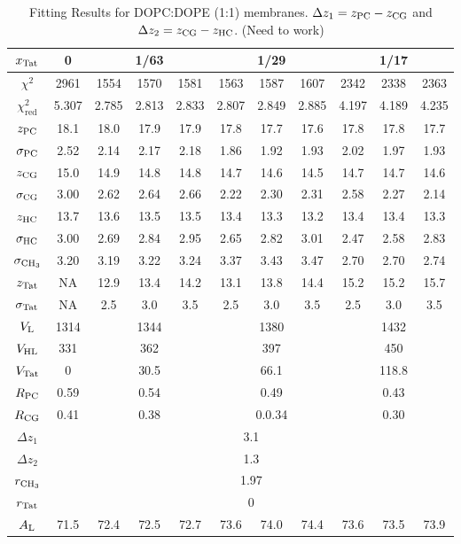 \begin{table}[htbp]
  \centering
  \begin{tabular}{|c|c|c|c|c|c|c|c|c|c|c|}
    \hline
    $x_\textrm{Tat}$ & 0 & \multicolumn{3}{c|}{1/63} & \multicolumn{3}{c|}{1/29} & \multicolumn{3}{c|}{1/17} \\
    \hline
    $\chi^2$ & 2961 & 1554 & 1570 & 1581 & 1563 & 1587 & 1607 & 2342 & 2338 & 2363 \\ 
    $\chi^2_\textrm{red}$ & 5.307 & 2.785 & 2.813 & 2.833 & 2.807 & 2.849 & 2.885 & 4.197 & 4.189 & 4.235 \\
    \hline
    $z_\textrm{PC}$ & 18.1 & 18.0 & 17.9 & 17.9 & 17.8 & 17.7 & 17.6 & 17.8 & 17.8 & 17.7 \\
    $\sigma_\textrm{PC}$ & 2.52 & 2.14 & 2.17 & 2.18 & 1.86 & 1.92 & 1.93 & 2.02 & 1.97 & 1.93 \\
    $z_\textrm{CG}$ & 15.0 & 14.9 & 14.8 & 14.8 & 14.7 & 14.6 & 14.5 & 14.7 & 14.7 & 14.6 \\
    $\sigma_\textrm{CG}$ & 3.00 & 2.62 & 2.64 & 2.66 & 2.22 & 2.30 & 2.31 & 2.58 & 2.27 & 2.14 \\
    $z_\textrm{HC}$ & 13.7 & 13.6 & 13.5 & 13.5 & 13.4 & 13.3 & 13.2 & 13.4 & 13.4 & 13.3 \\ 
    $\sigma_\textrm{HC}$ & 3.00 & 2.69 & 2.84 & 2.95 & 2.65 & 2.82 & 3.01 & 2.47 & 2.58 & 2.83 \\
    $\sigma_{\textrm{CH}_3}$ & 3.20 & 3.19 & 3.22 & 3.24 & 3.37 & 3.43 & 3.47 & 2.70 & 2.70 & 2.74 \\
    $z_\textrm{Tat}$ & NA & 12.9 & 13.4 & 14.2 & 13.1 & 13.8 & 14.4 & 15.2 & 15.2 & 15.7 \\
    $\sigma_\textrm{Tat}$ & NA & 2.5 & 3.0 & 3.5 & 2.5 & 3.0 & 3.5 & 2.5 & 3.0 & 3.5 \\ 
    \hline
    $V_\textrm{L}$ & 1314 & \multicolumn{3}{c|}{1344} & \multicolumn{3}{c|}{1380} & \multicolumn{3}{c|}{1432} \\ 
    $V_\textrm{HL}$ & 331 & \multicolumn{3}{c|}{362} & \multicolumn{3}{c|}{397} & \multicolumn{3}{c|}{450} \\
    $V_\textrm{Tat}$ & 0 & \multicolumn{3}{c|}{30.5} & \multicolumn{3}{c|}{66.1} & \multicolumn{3}{c|}{118.8} \\
    $R_\textrm{PC}$ & 0.59 & \multicolumn{3}{c|}{0.54} & \multicolumn{3}{c|}{0.49} & \multicolumn{3}{c|}{0.43} \\
    $R_\textrm{CG}$ & 0.41 & \multicolumn{3}{c|}{0.38} & \multicolumn{3}{c|}{0.0.34} & \multicolumn{3}{c|}{0.30} \\
    \hline
    $\Delta z_1$ & \multicolumn{10}{c|}{3.1} \\
    $\Delta z_2$ & \multicolumn{10}{c|}{1.3} \\
    $r_{\textrm{CH}_3}$ & \multicolumn{10}{c|}{1.97} \\
    $r_\textrm{Tat}$ & \multicolumn{10}{c|}{0} \\
    \hline
    $A_\textrm{L}$ & 71.5 & 72.4 & 72.5 & 72.7 & 73.6 & 74.0 & 74.4 & 73.6 & 73.5 & 73.9 \\
    \hline
  \end{tabular}
  \caption{Fitting Results for DOPC:DOPE (1:1) membranes. $\Delta z_1 = z_\textrm{PC}-z_\textrm{CG}$
  and $\Delta z_2 = z_\textrm{CG}-z_\textrm{HC}$. (Need to work)}
  \label{tb:DOPCDOPE1to1_fit_results}
\end{table}

